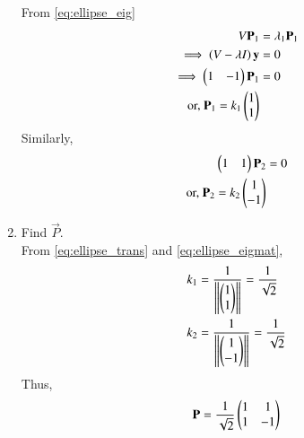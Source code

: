 \begin{enumerate}[label=\arabic*.,ref=\thesubsection.\theenumi]
\solution From \eqref{eq:ellipse_eig}
\begin{align}
V\mathbf{P}_1 &= \lambda_1 \mathbf{P}_1
\\
\implies \left(V-\lambda I\right) \mathbf{y}&= 0
\\
\implies \begin{pmatrix}1 & -1\end{pmatrix} \mathbf{P}_1&= 0
\\
\text{or, } \mathbf{P}_1 = k_1 \begin{pmatrix}1 \\ 1\end{pmatrix}
\label{eq:ellipsen1}
\end{align}
%
Similarly, 
%
\begin{align}
\begin{pmatrix}1 &  1\end{pmatrix}\mathbf{P}_2&= 0
\\
\text{or, } \mathbf{P}_2 = k_2 \begin{pmatrix}1 \\ -1\end{pmatrix}
\end{align}
%
\item Find $\vec{P}$.
\\
\solution From \eqref{eq:ellipse_trans} and \eqref{eq:ellipse_eigmat},
\begin{align}
k_1 &=  \frac{1}{\left\lVert\begin{pmatrix}1 \\ 1\end{pmatrix}\right\rVert} = \frac{1}{\sqrt{2}}
\\
k_2 &=  \frac{1}{\left\lVert\begin{pmatrix}1 \\ -1\end{pmatrix}\right\rVert} = \frac{1}{\sqrt{2}}
\end{align}
%
Thus,
\begin{align}
\mathbf{P} = \frac{1}{\sqrt{2}}\begin{pmatrix}1 & 1 \\ 1 & -1\end{pmatrix}
\end{align}


\end{enumerate}
